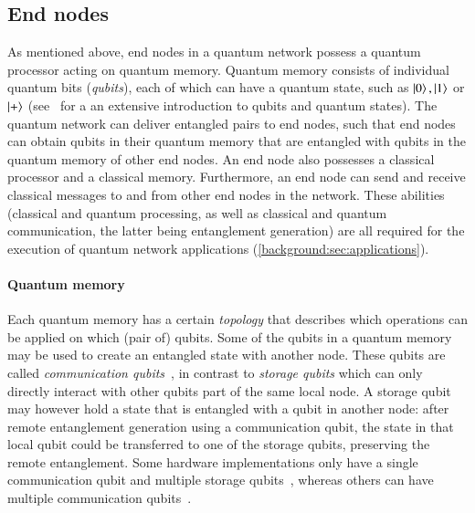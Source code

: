 \subsection{End nodes}
\label{background:sec:end_nodes}

As mentioned above, end nodes in a quantum network possess a quantum processor acting on quantum memory.
Quantum memory consists of individual quantum bits (\emph{qubits}), each of which can have a quantum state, such as $\ket{0}, \ket{1}$ or $\ket{+}$ (see~\cite{nielsen_chuang_2002} for a an extensive introduction to qubits and quantum states).
The quantum network can deliver entangled pairs to end nodes, such that end nodes can obtain qubits in their quantum memory that are entangled with qubits in the quantum memory of other end nodes.
An end node also possesses a classical processor and a classical memory.
Furthermore, an end node can send and receive classical messages to and from other end nodes in the network.
These abilities (classical and quantum processing, as well as classical and quantum communication, the latter being entanglement generation) are all required for the execution of quantum network applications (\cref{background:sec:applications}).



\paragraph{Quantum memory}
Each quantum memory has a certain \textit{topology} that describes which operations can be applied on which (pair of) qubits.
Some of the qubits in a quantum memory may be used to create an entangled state with another node.
These qubits are called \emph{communication qubits}~\cite{dahlberg2019linklayer}, in contrast to \emph{storage qubits} which can only directly interact with other qubits part of the same local node.
A storage qubit may however hold a state that is entangled with a qubit in another node: after remote entanglement generation using a communication qubit, the state in that local qubit could be transferred to one of the storage qubits, preserving the remote entanglement.
Some hardware implementations only have a single communication qubit and multiple storage qubits~\cite{Bernien2014}, whereas others can have multiple communication qubits~\cite{Inlek2017}.

